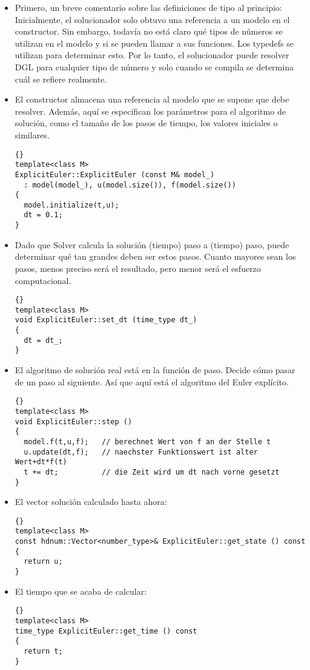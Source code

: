 \documentclass[a4paper,11pt]{article}
\theoremstyle{definition}
\begin{document}
\begin{itemize}
\item Primero, un breve comentario sobre las definiciones de tipo al principio: Inicialmente, el solucionador solo obtuvo una referencia a un modelo en el constructor. Sin embargo, todavía no está claro qué tipos de números se utilizan en el modelo y si se pueden llamar a sus funciones. Los typedefs se utilizan para determinar esto. Por lo tanto, el solucionador puede resolver DGL para cualquier tipo de número y solo cuando se compila se determina cuál se refiere realmente.

\item El constructor almacena una referencia al modelo que se supone que debe resolver. Además, aquí se especifican los parámetros para el algoritmo de solución, como el tamaño de los pasos de tiempo, los valores iniciales o similares.
{\footnotesize{\begin{lstlisting}{}
template<class M>
ExplicitEuler::ExplicitEuler (const M& model_)
  : model(model_), u(model.size()), f(model.size())
{
  model.initialize(t,u);
  dt = 0.1;
}
\end{lstlisting}}}

\item Dado que Solver calcula la solución (tiempo) paso a (tiempo) paso, puede determinar qué tan grandes deben ser estos pasos. Cuanto mayores sean los pasos, menos preciso será el resultado, pero menor será el esfuerzo computacional.

{\footnotesize{\begin{lstlisting}{}
template<class M>
void ExplicitEuler::set_dt (time_type dt_)
{
  dt = dt_;
}
\end{lstlisting}}}

\item El algoritmo de solución real está en la función de paso. Decide cómo pasar de un paso al siguiente. Así que aquí está el algoritmo del Euler explícito.

{\footnotesize{\begin{lstlisting}{}
template<class M>
void ExplicitEuler::step ()
{
  model.f(t,u,f);   // berechnet Wert von f an der Stelle t
  u.update(dt,f);   // naechster Funktionswert ist alter Wert+dt*f(t)
  t += dt;          // die Zeit wird um dt nach vorne gesetzt
}
\end{lstlisting}}}

\item El vector solución calculado hasta ahora:
{\footnotesize{\begin{lstlisting}{}
template<class M>
const hdnum::Vector<number_type>& ExplicitEuler::get_state () const
{
  return u;
}
\end{lstlisting}}}
\item El tiempo que se acaba de calcular:
{\footnotesize{\begin{lstlisting}{}
template<class M>
time_type ExplicitEuler::get_time () const
{
  return t;
}
\end{lstlisting}}}


\end{itemize}
\end{document}
